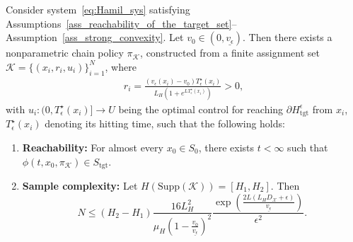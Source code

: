 \documentclass[10pt,a4paper]{amsart}
\newcommand{\Supp}{\mathrm{Supp}}
\newcommand{\tgt}{\mathrm{tgt}}
\begin{document}
\begin{theorem}
\label{thm_existence_chain_policy}
Consider system~\eqref{eq:Hamil_sys} satisfying Assumptions~\ref{ass_reachability_of_the_target_set}--Assumption~\ref{ass_strong_convexity}. Let $v_0 \in (0,\underline{v_\epsilon})$.
Then there exists a nonparametric chain policy $\pi_{\mathcal{K}}$, constructed from a finite assignment set $\mathcal{K}=\{(x_i,r_i,u_i)\}_{i=1}^{N}$, where
\begin{align*}
r_i=\frac{(v_\epsilon(x_i)-v_0)T_\epsilon^\star(x_i)}{L_H(1+e^{LT_\epsilon^\star(x_i)})}>0,
\end{align*}
with $u_i:(0,T_\epsilon^\star(x_i)]\to {U}$ being the optimal control for reaching $\partial H_{\tgt}^\epsilon$ from $x_i$, $T_\epsilon^\star(x_i)$ denoting its hitting time, such that the following holds:
\begin{enumerate}
\item \textbf{Reachability:} For almost every $x_0\in S_0$, there exists $t<\infty$ such that $\phi(t,x_0,\pi_{\mathcal{K}})\in S_{\tgt}$.
\item \textbf{Sample complexity:} Let $H(\Supp(\mathcal{K}))=[H_1,H_2]$. Then
\[
N\leq (H_2-H_1)\frac{16L_H^2}{\mu_H (1-\frac{v_0}{\underline{v_\epsilon}})^2}\frac{\exp(\frac{2L(L_HD_{\mathcal{X}}+\epsilon)}{\underline{v_\epsilon}})}{\epsilon^2}.
\]
\end{enumerate}
\end{theorem}
\end{document}
